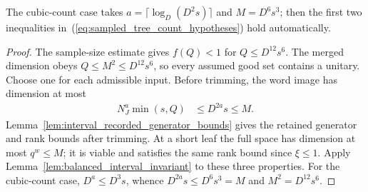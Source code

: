 \begin{lemma}
    The cubic-count case takes
    $a=\lceil\log_D(D^2s)\rceil$ and $M=D^6s^3$; then the first two
    inequalities in~(\ref{eq:sampled_tree_count_hypotheses}) hold automatically.
\end{lemma}
\begin{proof}\leanok
    The sample-size estimate gives $f(Q)<1$ for $Q\le D^{12}s^6$.
    The merged dimension obeys $Q\le M^2\le D^{12}s^6$, so every assumed
    good set contains a unitary. Choose one for each admissible input.
    Before trimming, the word image has dimension at most
    \begin{align}
        N_J^a\min(s,Q) & \le D^{2a}s\le M.
        \label{eq:sampled_tree_word_count}
    \end{align}
    Lemma~\ref{lem:interval_recorded_generator_bounds} gives the retained
    generator and rank bounds after trimming. At a short leaf the full
    space has dimension at most $q^w\le M$; it is viable and satisfies
    the same rank bound since $\xi\le1$. Apply
    Lemma~\ref{lem:balanced_interval_invariant} to these three properties.
    For the cubic-count case, $D^a\le D^3s$, whence
    $D^{2a}s\le D^6s^3=M$ and $M^2=D^{12}s^6$.
\end{proof}

